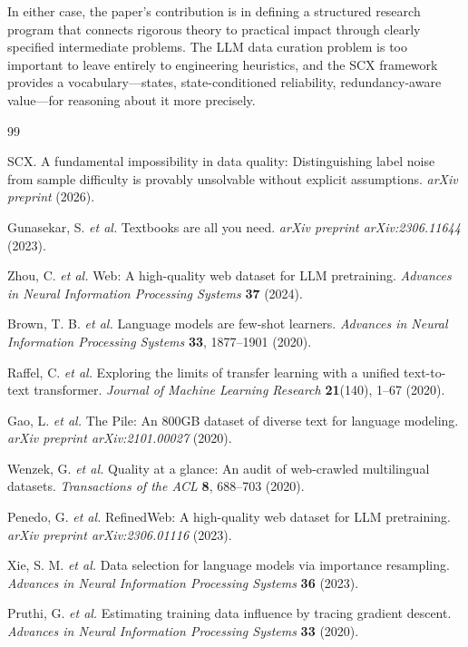 \documentclass[11pt,twocolumn]{article}
\begin{document}
In either case, the paper's contribution is in defining a structured research program that connects rigorous theory to practical impact through clearly specified intermediate problems. The LLM data curation problem is too important to leave entirely to engineering heuristics, and the SCX framework provides a vocabulary---states, state-conditioned reliability, redundancy-aware value---for reasoning about it more precisely.

\begin{thebibliography}{99}

SCX. A fundamental impossibility in data quality: Distinguishing label noise from sample difficulty is provably unsolvable without explicit assumptions. \textit{arXiv preprint} (2026).

Gunasekar, S. \textit{et al.} Textbooks are all you need. \textit{arXiv preprint arXiv:2306.11644} (2023).

Zhou, C. \textit{et al.} Web: A high-quality web dataset for LLM pretraining. \textit{Advances in Neural Information Processing Systems} \textbf{37} (2024).

Brown, T. B. \textit{et al.} Language models are few-shot learners. \textit{Advances in Neural Information Processing Systems} \textbf{33}, 1877--1901 (2020).

Raffel, C. \textit{et al.} Exploring the limits of transfer learning with a unified text-to-text transformer. \textit{Journal of Machine Learning Research} \textbf{21}(140), 1--67 (2020).

Gao, L. \textit{et al.} The Pile: An 800GB dataset of diverse text for language modeling. \textit{arXiv preprint arXiv:2101.00027} (2020).

Wenzek, G. \textit{et al.} Quality at a glance: An audit of web-crawled multilingual datasets. \textit{Transactions of the ACL} \textbf{8}, 688--703 (2020).

Penedo, G. \textit{et al.} RefinedWeb: A high-quality web dataset for LLM pretraining. \textit{arXiv preprint arXiv:2306.01116} (2023).

Xie, S. M. \textit{et al.} Data selection for language models via importance resampling. \textit{Advances in Neural Information Processing Systems} \textbf{36} (2023).

Pruthi, G. \textit{et al.} Estimating training data influence by tracing gradient descent. \textit{Advances in Neural Information Processing Systems} \textbf{33} (2020).


\end{thebibliography}
\end{document}
